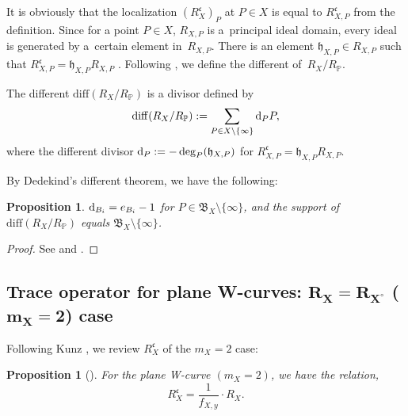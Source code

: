 \documentclass[pdftex]{sigma}
\def\PP{{\mathbb P}}
\def\fB{{\mathfrak B}}
\def\fc{{\mathfrak c}}
\def\fh{{\mathfrak h}}
\def\diff{\mathrm{diff}}
\numberwithin{equation}{section}
\newtheorem{Proposition}[Theorem]{Proposition}
 { \theoremstyle{definition}
\newtheorem{Definition}[Theorem]{Definition}
\newtheorem{Note}[Theorem]{Note}
\newtheorem{Example}[Theorem]{Example}
\newtheorem{Remark}[Theorem]{Remark} }
\begin{document}
It is obviously that the localization $(R_{X}^{\fc})_P$ at $P\in X$ is equal to $R_{X,P}^{\fc}$ from the definition.
Since for a point $P\in X$, $R_{X,P}$ is a~principal ideal domain, every ideal is generated by a~certain element in~$R_{X,P}$.
There is an element $\fh_{X,P} \in R_{X,P}$ such that $R_{X,P}^{\fc}=\fh_{X,P}R_{X,P}$ \cite[Proposition~3.4.2]{Stichtenoth}.
Following \cite[Definition~3.4.3]{Stichtenoth}, we define the different of~$R_X/R_\PP$.

\begin{Definition}\label{2df:2.32}
The different $\diff(R_X/R_\PP)$ is a divisor defined by
\[
\diff(R_X/R_\PP):=\sum_{P\in X\setminus\{\infty\}} {\rm d}_{P} P,
\]
where the different divisor ${\rm d}_{P}:= -\deg_P(\fh_{X,P})$ for $R_{X,P}^\fc =\fh_{X,P} R_{X,P}$.
\end{Definition}

By Dedekind's different theorem, we have the following:
\begin{Proposition}\label{2pr:DedekindDiff1}
${\rm d}_{B_i}=e_{B_i}-1$ for $P \in \fB_X\setminus\{\infty\}$, and the support of $\diff(R_X/R_\PP)$ equals $\fB_X\setminus \{\infty\}$.
\end{Proposition}

\begin{proof}See \cite[Theorem 15.11]{Kunz2004} and \cite[Theorem 3.5.1]{Stichtenoth}.
\end{proof}

\subsection[Trace operator for plane W-curves: R\_X=R\_\{X\^{}circ\} (m\_X=2) case]{Trace operator for plane W-curves: $\boldsymbol{R_X = R_{X^\circ}}$ ($\boldsymbol{m_X=2}$) case}\label{2sssec:m_X=2}

Following Kunz \cite[Theorem 15.1]{Kunz2004}, we review $R_X^\fc$ of the $m_X=2$ case:
\begin{Proposition}[{\cite[Theorem 15.1]{Kunz2004}}]\label{2pr:Kunz_m2}
For the plane W-curve $(m_X=2)$, we have the relation,%
\begin{equation}
 R_X^\fc = \frac{1}{f_{X,y}}\cdot R_X.\label{2eq:RXfc}
\end{equation}
\end{Proposition}
\end{document}
